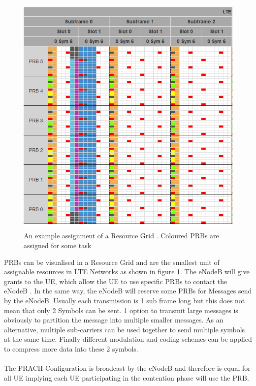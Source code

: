 \documentclass[conference]{IEEEtran}
\begin{document}
\begin{figure}
    \centering
    \includegraphics[width = \columnwidth]{Figures/Resource_Grid1.PNG}
    \caption{An example assignment of a Resource Grid \cite{ResourceGridCalculator}. Coloured PRBs are assigned for some task}
    \label{fig:grid}
\end{figure}
PRBs can be visualised in a Resource Grid and are the smallest unit of assignable resources in LTE Networks as shown in figure \ref{fig:grid}.
The eNodeB will give grants to the UE, which allow the UE to use specific PRBs to contact the eNodeB .
In the same way, the eNodeB will reserve some PRBs for Messages send by the eNodeB.
Usually each transmission is 1 sub frame long but this does not mean that only 2 Symbols can be sent.
1 option to transmit large messages is obviously to partition the message into multiple smaller messages.
As an alternative, multiple sub-carriers can be used together to send multiple symbols at the same time.
Finally different modulation and coding schemes can be applied to compress more data into these 2 symbols.\\\\
The PRACH Configuration is broadcast by the eNodeB and therefore is equal for all UE implying each UE participating in the contention phase will use the PRB.
\end{document}

